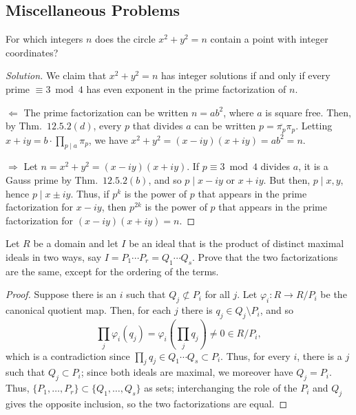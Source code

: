 \documentclass[12pt]{article}
\theoremstyle{remark}
\begin{document}
\renewcommand{\thesubsection}{\thesection.\Alph{subsection}}
\setcounter{subsection}{12}
\subsection{Miscellaneous Problems}
\setcounter{subsubsection}{4}
\begin{problem}
  For which integers $n$ does the circle $x^2 + y^2 = n$ contain a point with integer coordinates?
\end{problem}
\begin{proof}[Solution]
  We claim that $x^2 + y^2 = n$ has integer solutions if and only if every prime $\equiv 3 \bmod 4$ has even exponent in the prime factorization of $n$.
  \par $\Leftarrow$ The prime factorization can be written $n = ab^2$, where $a$ is square free. Then, by Thm.~$12.5.2(d)$, every $p$ that divides $a$ can be written $p = \overline{\pi_p}\pi_p$. Letting $x + iy = b\cdot \prod_{p \mid a} \pi_p$, we have $x^2 + y^2 = (x-iy)(x+iy) = ab^2 = n$.
  \par $\Rightarrow$ Let $n = x^2 + y^2 = (x-iy)(x+iy)$. If $p \equiv 3 \bmod 4$ divides $a$, it is a Gauss prime by Thm.~$12.5.2(b)$, and so $p \mid x - iy$ or $x + iy$. But then, $p \mid x,y$, hence $p \mid x\pm iy$. Thus, if $p^k$ is the power of $p$ that appears in the prime factorization for $x-iy$, then $p^{2k}$ is the power of $p$ that appears in the prime factorization for $(x-iy)(x+iy) = n$.
\end{proof}

\begin{problem}\label{exc:12.M.6}
  Let $R$ be a domain and let $I$ be an ideal that is the product of distinct maximal ideals in two ways, say $I = P_1\cdots P_r = Q_1\cdots Q_s$.  Prove that the two factorizations are the same, except for the ordering of the terms.
\end{problem}
\begin{proof}
  Suppose there is an $i$ such that $Q_j \not\subset P_i$ for all $j$. Let $\varphi_i \colon R \to R/P_i$ be the canonical quotient map. Then, for each $j$ there is $q_j \in Q_j \setminus P_i$, and so
  \begin{equation*}
    \prod_j \varphi_i(q_j) = \varphi_i\left( \prod_j q_j \right) \ne 0 \in R/P_i,
  \end{equation*}
  which is a contradiction since $\prod_j q_j \in Q_1 \cdots Q_s \subset P_i$. Thus, for every $i$, there is a $j$ such that $Q_j \subset P_i$; since both ideals are maximal, we moreover have $Q_j = P_i$. Thus, $\{P_1,\ldots,P_r\} \subset \{Q_1,\ldots,Q_s\}$ as sets; interchanging the role of the $P_i$ and $Q_j$ gives the opposite inclusion, so the two factorizations are equal.
\end{proof}
\end{document}
